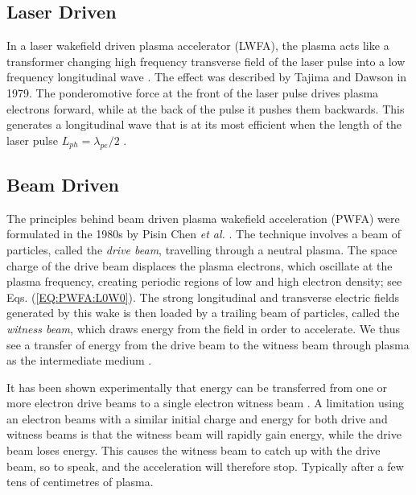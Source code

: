 \subsection{Laser Driven}
\label{Int:LWFA}

In a laser wakefield driven plasma accelerator (LWFA), the plasma acts like a transformer changing high frequency transverse field of the laser pulse into a low frequency longitudinal wave \cite{malka:2009}. The effect was described by Tajima and Dawson in 1979. The ponderomotive force at the front of the laser pulse drives plasma electrons forward, while at the back of the pulse it pushes them backwards. This generates a longitudinal wave that is at its most efficient when the length of the laser pulse $L_{ph} = \lambda_{pe}/2$ \cite{tajima:1979}.

\subsection{Beam Driven}
\label{Int:BDPWFA}

The principles behind beam driven plasma wakefield acceleration (PWFA) were formulated in the 1980s by Pisin Chen \emph{et al.} \cite{chen:1985}. The technique involves a beam of particles, called the \emph{drive beam}, travelling through a neutral plasma. The space charge of the drive beam displaces the plasma electrons, which oscillate at the plasma frequency, creating periodic regions of low and high electron density; see Eqs. (\ref{EQ:PWFA:L0W0}). The strong longitudinal and transverse electric fields generated by this wake is then loaded by a trailing beam of particles, called the \emph{witness beam}, which draws energy from the field in order to accelerate. We thus see a transfer of energy from the drive beam to the witness beam through plasma as the intermediate medium \cite{muggli:2009}.

It has been shown experimentally that energy can be transferred from one or more electron drive beams to a single electron witness beam \cite{rosenzweig:1988, blumenfeld:2007, kallos:2008, litos:2014}. A limitation using an electron beams with a similar initial charge and energy for both drive and witness beams is that the witness beam will rapidly gain energy, while the drive beam loses energy. This causes the witness beam to catch up with the drive beam, so to speak, and the acceleration will therefore stop. Typically after a few tens of centimetres of plasma.

